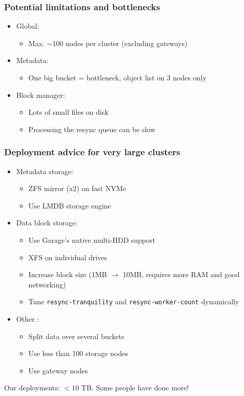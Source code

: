 \documentclass[aspectratio=169,xcolor={svgnames}]{beamer}
\begin{document}
\begin{frame}
	\frametitle{Potential limitations and bottlenecks}
	\begin{itemize}
		\item Global:
			\begin{itemize}
				\item Max. $\sim$100 nodes per cluster (excluding gateways)
			\end{itemize}
			\vspace{1em}
		\item Metadata:
			\begin{itemize}
				\item One big bucket = bottleneck, object list on 3 nodes only
			\end{itemize}
			\vspace{1em}
		\item Block manager:
			\begin{itemize}
				\item Lots of small files on disk
				\item Processing the resync queue can be slow
			\end{itemize}
	\end{itemize}
\end{frame}

\begin{frame}
	\frametitle{Deployment advice for very large clusters}
	\begin{itemize}
		\item Metadata storage:
			\begin{itemize}
				\item ZFS mirror (x2) on fast NVMe
				\item Use LMDB storage engine
			\end{itemize}
			\vspace{.5em}
		\item Data block storage:
			\begin{itemize}
				\item Use Garage's native multi-HDD support
				\item XFS on individual drives
				\item Increase block size (1MB $\to$ 10MB, requires more RAM and good networking)
				\item Tune \texttt{resync-tranquility} and \texttt{resync-worker-count} dynamically
			\end{itemize}
			\vspace{.5em}
		\item Other :
			\begin{itemize}
				\item Split data over several buckets
				\item Use less than 100 storage nodes
				\item Use gateway nodes
			\end{itemize}
			\vspace{.5em}
	\end{itemize}
	Our deployments: $< 10$ TB. Some people have done more!
\end{frame}
\end{document}
